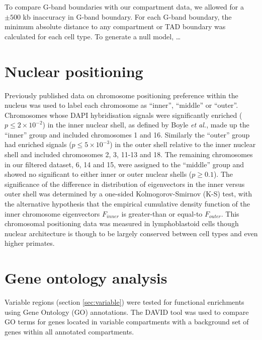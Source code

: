 \documentclass[a4paper,10pt,oneside]{book}
\begin{document}
To compare G-band boundaries with our compartment data, we allowed for a
$\pm 500$ kb inaccuracy in G-band boundary. For each G-band boundary,
the minimum absolute distance to any compartment or TAD boundary was
calculated for each cell type. To generate a null model, \ldots

\section{Nuclear positioning}
Previously published data  on chromosome positioning preference within
the nucleus was used to label each chromosome as ``inner'', ``middle''
or ``outer''.\cite{Boyle2001} Chromosomes whose DAPI hybridisation
signals were significantly enriched ($p\leq 2\times10^{-2}$) in the inner nuclear shell, as
defined by Boyle \emph{et al.}\cite{Boyle2001}, made up the ``inner''
group and included chromosomes 1 and 16. Similarly the ``outer'' group
had enriched signals ($p\leq 5\times10^{-3}$) in the outer shell relative to the inner nuclear
shell and included chromosomes 2, 3, 11-13 and 18. The remaining
chromosomes in our filtered dataset, 6, 14 and 15, were assigned to
the ``middle'' group and showed no significant to either inner or
outer nuclear shells ($p \geq 0.1$).\cite{Boyle2001} The significance
of the difference in distribution of eigenvectors in the inner
versus outer shell was determined by a one-sided Kolmogorov-Smirnov (K-S)
test, with the alternative hypothesis that the empirical cumulative
density function of the inner chromosome eigenvectors $F_{inner}$
is greater-than or equal-to $F_{outer}$. This chromosomal positioning data was measured in lymphoblastoid
cells though nuclear architecture is though to be largely conserved
between cell types\cite{Chambers2013, DeWit2013} and even higher primates.\cite{Tanabe2002}

\section{Gene ontology analysis}

Variable regions (section \ref{sec:variable}) were tested for functional enrichments using Gene Ontology (GO) annotations.\cite{Ashburner2000} The DAVID tool\cite{Huang2008} was used to compare GO terms for genes located in variable compartments with a background set of genes within all annotated compartments.


\ifstandalone
\begin{small}

\end{small}
\fi
\end{document}
